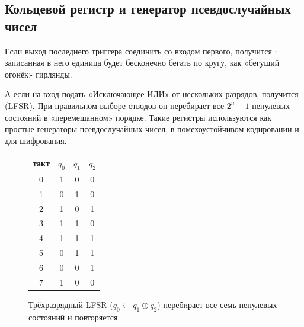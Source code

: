 \subsection{Кольцевой регистр и генератор псевдослучайных чисел}

Если выход последнего триггера соединить со входом первого, получится
: записанная в него единица будет бесконечно бегать по
кругу, как «бегущий огонёк» гирлянды. 

А если на вход подать «Исключающее ИЛИ» от нескольких разрядов, получится
 (LFSR). При правильном выборе
отводов он перебирает все $2^n-1$ ненулевых состояний в «перемешанном»
порядке. Такие регистры используются как простые генераторы
псевдослучайных чисел, в помехоустойчивом кодировании и для шифрования.

\begin{figure}[H]
\centering
\begin{minipage}{0.55\textwidth}
\centering
{}
\end{minipage}\hfill
\begin{minipage}{0.4\textwidth}
\centering
\small
\begin{tabular}{c|ccc}
\toprule
такт & $q_0$ & $q_1$ & $q_2$ \\
\midrule
0 & 1 & 0 & 0 \\
1 & 0 & 1 & 0 \\
2 & 1 & 0 & 1 \\
3 & 1 & 1 & 0 \\
4 & 1 & 1 & 1 \\
5 & 0 & 1 & 1 \\
6 & 0 & 0 & 1 \\
7 & 1 & 0 & 0 \\
\bottomrule
\end{tabular}
\end{minipage}
\caption{Трёхразрядный LFSR ($q_0 \leftarrow q_1\oplus q_2$) перебирает все семь
ненулевых состояний и повторяется}
\label{fig:lfsr}
\end{figure}

